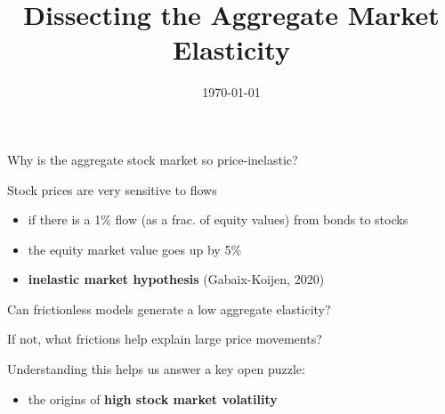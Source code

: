 \documentclass[12pt,aspectratio=169]{beamer}
\title{Dissecting the Aggregate Market Elasticity}
\date{\today}
\author[Short Name (U ABC)]{%
	\texorpdfstring{%
		\begin{columns}
			\column{.25\linewidth}
			\centering
			Victor Duarte \\ {\small UIUC}
			\column{.25\linewidth}
			\centering
			Mahyar Kargar \\ {\small UIUC}
			\column{.25\linewidth}
			\centering
			Dejanir Silva \\ {\small Purdue}			
		\end{columns}		
		\vspace{15pt}
		\begin{columns}
			\column{\linewidth}		
		\end{columns}
	}
	{Author 1, Author 2, Author 3}
}
\newenvironment{wideitemize}{\itemize\addtolength{\itemsep}{10pt}}{\enditemize}
\newcommand{\vspM}{\vspace{0.12truecm}}
\begin{document}
\maketitle

\begin{frame}{Why is the aggregate stock market so price-inelastic?}
    \begin{wideitemize}
        \item Stock prices are very sensitive to flows\vspM
        \begin{itemize}
            \item if there is a 1\% flow {\scriptsize(as a frac. of equity values)} from bonds to stocks
            \item the equity market value goes up by 5\%
            \item \textbf{inelastic market hypothesis} {\scriptsize(Gabaix-Koijen, 2020)}
        \end{itemize}
        \item Can frictionless models generate a low aggregate elasticity?
        \item If not, what frictions help explain large price movements?
        \item Understanding this helps us answer a key open puzzle:\vspM
        \begin{itemize}\normalsize
            \item the origins of \textbf{high stock market volatility}
        \end{itemize}
        
    \end{wideitemize}
\end{frame}
\end{document}
